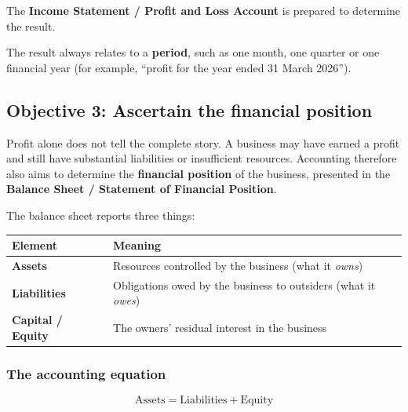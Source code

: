 \documentclass[11pt,a4paper]{article}
\begin{document}
The \textbf{Income Statement / Profit and Loss Account} is prepared to determine the result.

\begin{impbox}
The result always relates to a \textbf{period}, such as one month, one quarter or one financial
year (for example, ``profit for the year ended 31 March 2026'').
\end{impbox}

\subsection{Objective 3: Ascertain the financial position}

Profit alone does not tell the complete story. A business may have earned a profit and still
have substantial liabilities or insufficient resources. Accounting therefore also aims to
determine the \textbf{financial position} of the business, presented in the
\textbf{Balance Sheet / Statement of Financial Position}.

The balance sheet reports three things:

\begin{center}
\small
\begin{tabularx}{\textwidth}{@{}l Y@{}}
\toprule
{}\textbf{Element} & \textbf{Meaning}\\
\midrule
\textbf{Assets} & Resources controlled by the business (what it \emph{owns})\\
\textbf{Liabilities} & Obligations owed by the business to outsiders (what it \emph{owes})\\
\textbf{Capital / Equity} & The owners' residual interest in the business\\
\bottomrule
\end{tabularx}
\end{center}

\subsubsection{The accounting equation}

\[
\boxed{\text{Assets}=\text{Liabilities}+\text{Equity}}
\]

\begin{center}
\end{center}
\end{document}
